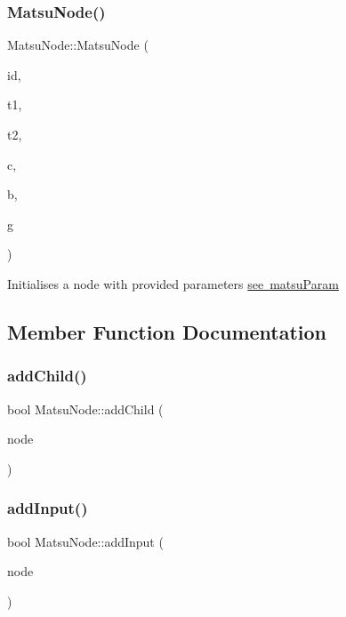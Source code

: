 \subsubsection{\texorpdfstring{Matsu\+Node()}{MatsuNode()}\hspace{0.1cm}{\footnotesize\ttfamily [4/4]}}
{\footnotesize\ttfamily Matsu\+Node\+::\+Matsu\+Node (\begin{DoxyParamCaption}\item[{unsigned}]{id,  }\item[{double}]{t1,  }\item[{double}]{t2,  }\item[{double}]{c,  }\item[{double}]{b,  }\item[{double}]{g }\end{DoxyParamCaption})}

Initialises a node with provided parameters \mbox{\hyperlink{classMatsuNode_aed801e1d0363292efc99bb02f1911386}{see matsu\+Param}} 

\subsection{Member Function Documentation}
\mbox{\label{classMatsuNode_a7056a59c333c238b2a583b59bcdb278d}} 
\subsubsection{\texorpdfstring{add\+Child()}{addChild()}}
{\footnotesize\ttfamily bool Matsu\+Node\+::add\+Child (\begin{DoxyParamCaption}\item[{\mbox{\hyperlink{classMatsuNode}{Matsu\+Node}} \&}]{node }\end{DoxyParamCaption})}

\mbox{\label{classMatsuNode_a1eb3cb48dd269efdb5f629f363380fb6}} 
\subsubsection{\texorpdfstring{add\+Input()}{addInput()}}
{\footnotesize\ttfamily bool Matsu\+Node\+::add\+Input (\begin{DoxyParamCaption}\item[{\mbox{\hyperlink{classMatsuNode}{Matsu\+Node}} const \&}]{node }\end{DoxyParamCaption})\hspace{0.3cm}{\ttfamily [inline]}}

